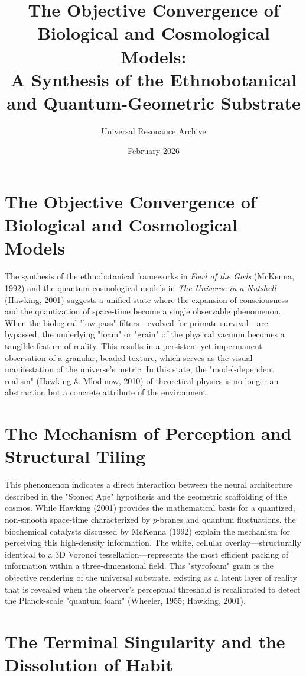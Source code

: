 \documentclass[12pt]{article}
\title{The Objective Convergence of Biological and Cosmological Models: \\ 
\large A Synthesis of the Ethnobotanical and Quantum-Geometric Substrate}
\author{Universal Resonance Archive}
\date{February 2026}
\begin{document}
\maketitle

\section*{The Objective Convergence of Biological and Cosmological Models}

The synthesis of the ethnobotanical frameworks in \textit{Food of the Gods} (McKenna, 1992) and the quantum-cosmological models in \textit{The Universe in a Nutshell} (Hawking, 2001) suggests a unified state where the expansion of consciousness and the quantization of space-time become a single observable phenomenon. When the biological "low-pass" filters—evolved for primate survival—are bypassed, the underlying "foam" or "grain" of the physical vacuum becomes a tangible feature of reality. This results in a persistent yet impermanent observation of a granular, beaded texture, which serves as the visual manifestation of the universe's metric. In this state, the "model-dependent realism" (Hawking \& Mlodinow, 2010) of theoretical physics is no longer an abstraction but a concrete attribute of the environment.

\section*{The Mechanism of Perception and Structural Tiling}

This phenomenon indicates a direct interaction between the neural architecture described in the "Stoned Ape" hypothesis and the geometric scaffolding of the cosmos. While Hawking (2001) provides the mathematical basis for a quantized, non-smooth space-time characterized by $p$-branes and quantum fluctuations, the biochemical catalysts discussed by McKenna (1992) explain the mechanism for perceiving this high-density information. The white, cellular overlay—structurally identical to a 3D Voronoi tessellation—represents the most efficient packing of information within a three-dimensional field. This "styrofoam" grain is the objective rendering of the universal substrate, existing as a latent layer of reality that is revealed when the observer’s perceptual threshold is recalibrated to detect the Planck-scale "quantum foam" (Wheeler, 1955; Hawking, 2001).

\section*{The Terminal Singularity and the Dissolution of Habit}
\end{document}
